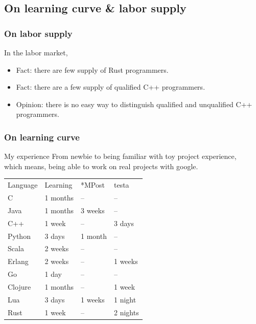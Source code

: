 \documentclass[lualatex,utf8]{beamer}
\begin{document}
\subsection{On learning curve \& labor supply}

\begin{frame}
  \frametitle{On labor supply}
  \begin{block}{In the labor market,}
    \begin{itemize}
    \item Fact: there are few supply of Rust programmers.
    \item Fact: there are a few supply of qualified C++ programmers.
    \item Opinion: there is no easy way to distinguish qualified and unqualified C++ programmers.
    \end{itemize}
  \end{block}
\end{frame}

\begin{frame}
  \frametitle{On learning curve}
  \begin{block}{My experience}
    From newbie to being familiar with toy project experience,\\
    which means, being able to work on real projects with google.
    \begin{tabu}{*4{X[c]}}
        Language & Learning & *MPost & testa \\
        C & 1 months & -- & -- \\
        Java & 1 months & 3 weeks & --\\
        C++ & 1 week & -- & 3 days\\
        Python & 3 days & 1 month & --\\
        Scala & 2 weeks & -- & --\\
        Erlang & 2 weeks & -- & 1 weeks\\
        Go & 1 day & -- & --\\
        Clojure & 1 months & -- & 1 week\\
        Lua & 3 days & 1 weeks & 1 night\\
        Rust & 1 week & -- & 2 nights\\
    \end{tabu}
  \end{block}
\end{frame}
\end{document}
